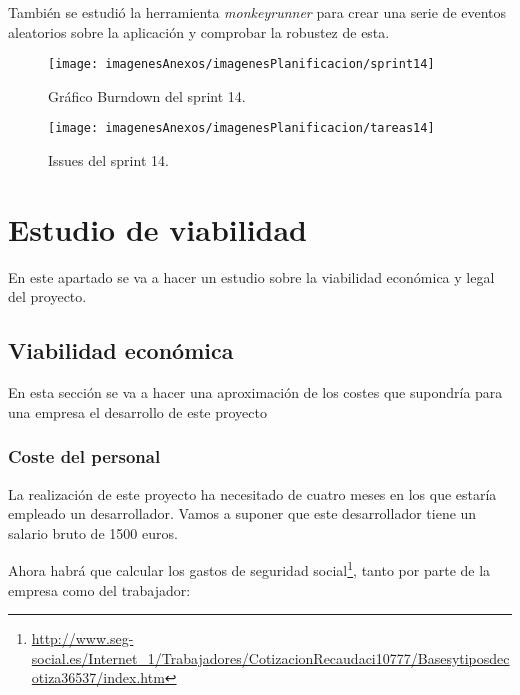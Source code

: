 También se estudió la herramienta \textit{monkeyrunner} para crear una serie de eventos aleatorios sobre la aplicación y comprobar la robustez de esta.
\newpage
\begin{figure}[ht]
    \begin{center}%
        \begin{center}%
          \texttt{[image: imagenesAnexos/imagenesPlanificacion/sprint14]}%
          \caption{Gráfico Burndown del sprint 14.}%
          \label{figSprint14}%
        \end{center}%
  	\end{center}%
\end{figure}%
\newpage
\begin{figure}[h]
    \begin{center}%
        \begin{center}%
          \texttt{[image: imagenesAnexos/imagenesPlanificacion/tareas14]}%
          \caption{Issues del sprint 14.}%
          \label{figTareas14}%
        \end{center}%
  	\end{center}%
\end{figure}%

\newpage
\section{Estudio de viabilidad}

En este apartado se va a hacer un estudio sobre la viabilidad económica y legal del proyecto.

\subsection{Viabilidad económica}

En esta sección se va a hacer una aproximación de los costes que supondría para una empresa el desarrollo de este proyecto

\subsubsection{Coste del personal}

La realización de este proyecto ha necesitado de cuatro meses en los que estaría empleado un desarrollador. Vamos a suponer que este desarrollador tiene un salario bruto de 1500 euros.

Ahora habrá que calcular los gastos de seguridad social\footnote{\url{http://www.seg-social.es/Internet_1/Trabajadores/CotizacionRecaudaci10777/Basesytiposdecotiza36537/index.htm}}, tanto por parte de la empresa como del trabajador:

